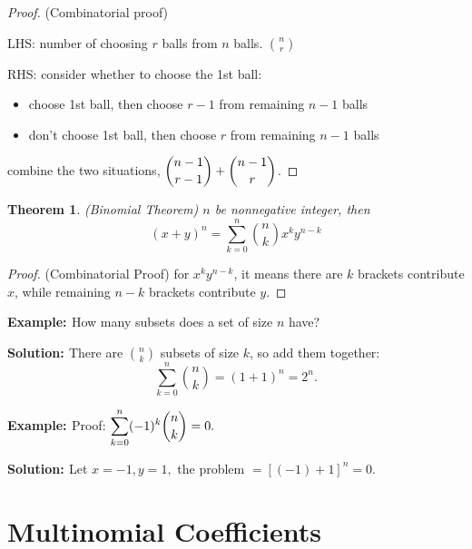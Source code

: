\documentclass[11pt, a4paper]{MATH2421}
\newtheorem*{theorem}{Theorem}
\newcommand{\eg}{{\bf {Example: }}}
\newcommand{\sol}{{\bf {Solution: }}}
\begin{document}
\begin{spacing}{1.3}
\begin{proof}
        (Combinatorial proof)

        LHS: number of choosing $r$ balls from $n$ balls. 
        ${n\choose r}$

        RHS: consider whether to choose the 1st ball:
        \begin{itemize}
            \item choose 1st ball, then choose $r-1$ from remaining
            $n-1$ balls
            \item don't choose 1st ball, then choose $r$ from remaining
            $n-1$ balls
        \end{itemize}
        combine the two situations, $\displaystyle {n-1\choose r-1}+{n-1\choose r}$.

    \end{proof}

    \begin{theorem}
        (Binomial Theorem) 
        $n$ be nonnegative integer, then
        $$(x+y)^n=\sum_{k=0}^{n}{n\choose k}x^ky^{n-k}$$
    \end{theorem}

    \begin{proof}
        (Combinatorial Proof) for $x^ky^{n-k}$, it means 
        there are $k$ brackets contribute $x$, while 
        remaining $n-k$ brackets contribute $y$.
    \end{proof}

    \eg How many subsets does a set of size $n$ have?

    \sol There are ${n\choose k}$ subsets of size $k$,
    so add them together:
    $$\sum_{k=0}^{n}{n\choose k}=(1+1)^n=2^n.$$

    \eg Proof: $\displaystyle \sum_{k=0}^{n}(-1)^k{n\choose k}=0.$

    \sol Let $x=-1, y=1,$ the problem $=[(-1)+1]^n=0$.
    

    \section{Multinomial Coefficients}
\end{spacing}
\end{document}
